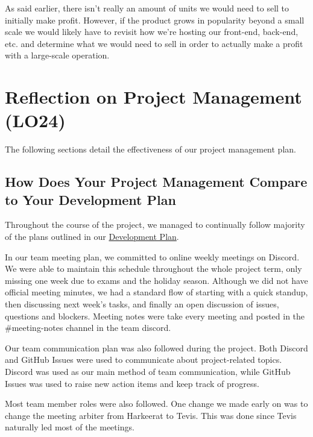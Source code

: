 \documentclass{article}
\begin{document}
As said earlier, there isn't really an amount of units we would need to sell to initially make profit. However, if the product grows in popularity beyond a small scale we would likely have to revisit how we're hosting our front-end, back-end, etc. and determine what we would need to sell in order to actually make a profit with a large-scale operation.
\section{Reflection on Project Management (LO24)}


The following sections detail the effectiveness of our project management plan.

\subsection{How Does Your Project Management Compare to Your Development Plan}


Throughout the course of the project, we managed to continually follow majority of the plans outlined in our \hyperlink{https://github.com/HKanwal/kapstone/blob/main/docs/DevelopmentPlan/DevelopmentPlan.pdf}{Development Plan}. 

In our team meeting plan, we committed to online weekly meetings on Discord. We were able to maintain this schedule throughout the whole project term, only missing one week due to exams and the holiday season. Although we did not have official meeting minutes, we had a standard flow of starting with a quick standup, then discussing next week's tasks, and finally an open discussion of issues, questions and blockers. Meeting notes were take every meeting and posted in the #meeting-notes channel in the team discord. 

Our team communication plan was also followed during the project. Both Discord and GitHub Issues were used to communicate about project-related topics. Discord was used as our main method of team communication, while GitHub Issues was used to raise new action items and keep track of progress.

Most team member roles were also followed. One change we made early on was to change the meeting arbiter from Harkeerat to Tevis. This was done since Tevis naturally led most of the meetings. 
\end{document}

